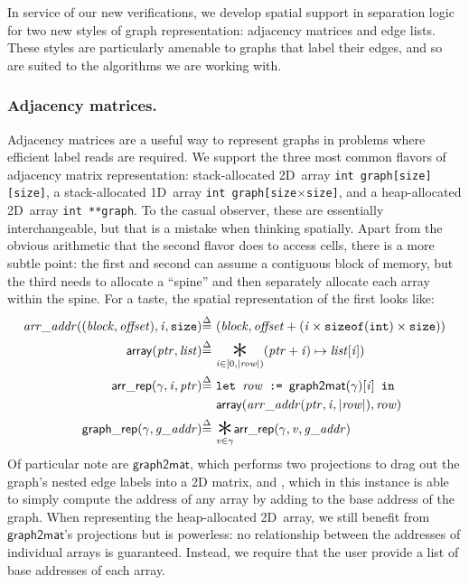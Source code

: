 In service of our new verifications, we develop spatial support in separation 
logic for two new styles of graph representation:
adjacency matrices and edge lists. These styles are particularly
amenable to graphs that label their edges, and so are suited to
the algorithms we are working with.


\subsubsection{Adjacency matrices.}

Adjacency matrices are a useful way to represent graphs
in problems where efficient label reads are required. 
We support the three most common 
flavors of adjacency matrix representation:
stack-allocated 2D~array \texttt{int~graph[size][size]},
a stack-allocated 1D~array \texttt{int~graph[size$\times$size]}, 
and a heap-allocated 2D~array \texttt{int~**graph}. 
To the casual observer, these are essentially interchangeable, but 
that is a mistake when thinking spatially. Apart from the obvious 
arithmetic that the second flavor does to access cells, there is a 
more subtle point: the first and second can
assume a contiguous block of memory, but the third needs to allocate
a ``spine'' and then separately allocate each array within the spine.
For a taste, the spatial representation of the first looks like:
\vspace{-0.5em}
\begin{equation*}
\begin{split}
\m{arr\_addr} ((\m{block}, \m{offset}), \m{i},\texttt{size}) \defeq~&
  (\m{block}, \m{offset} + (\m{i} \times \texttt{sizeof}(\texttt{int}) \times \texttt{size})) \\
\mathsf{array}(\m{ptr},\m{list}) \defeq~& \underset{\m{i} \in [0, \lvert\m{row}\rvert)}{\bigstar} (\m{ptr} + \m{i}) \mapsto \m{list}[\m{i}]) \\
\p{arr\_rep}(\gamma, \m{i}, \m{ptr}) \defeq~& \texttt{let }\m{row} \texttt{ := }\mathsf{graph2mat}(\gamma)[\m{i}] \texttt{ in } \\
&\mathsf{array}(\m{arr\_addr}(\m{ptr},\m{i},\lvert\m{row}\rvert), \m{row}) \\
\vspace{1em}
\p{graph\_rep}(\gamma, \m{g\_addr}) \defeq~& \underset{\m{v} \in \gamma}{\bigstar} \p{arr\_rep}(\gamma, \m{v}, \m{g\_addr})
\end{split}
\end{equation*}
Of particular note are $\mathsf{graph2mat}$, which performs two projections to
drag out the graph's nested edge labels into a 2D matrix, and 
, which in this instance is able to simply compute
the address of any array  by adding to the base address of the graph.
When representing the heap-allocated 2D~array, we still benefit from 
$\mathsf{graph2mat}$'s projections but  is powerless: no relationship
between the addresses of individual arrays is guaranteed.
Instead, we require that the user provide a list of base addresses
of each array. 

